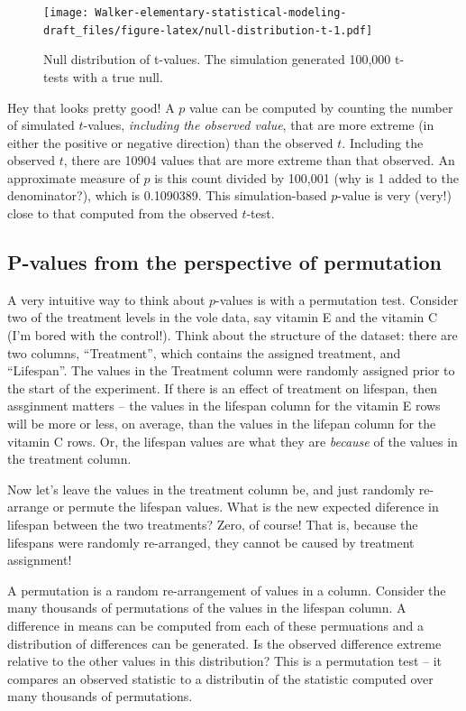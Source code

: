 \documentclass[]{book}
\theoremstyle{definition}
\theoremstyle{definition}
\theoremstyle{definition}
\theoremstyle{remark}
\begin{document}
\begin{figure}
\centering
\texttt{[image: Walker-elementary-statistical-modeling-draft\_files/figure-latex/null-distribution-t-1.pdf]}
\caption{\label{fig:null-distribution-t}Null distribution of t-values. The
simulation generated 100,000 t-tests with a true null.}
\end{figure}

Hey that looks pretty good! A \(p\) value can be computed by counting
the number of simulated \(t\)-values, \emph{including the observed
value}, that are more extreme (in either the positive or negative
direction) than the observed \(t\). Including the observed \(t\), there
are 10904 values that are more extreme than that observed. An
approximate measure of \(p\) is this count divided by 100,001 (why is 1
added to the denominator?), which is 0.1090389. This simulation-based
\(p\)-value is very (very!) close to that computed from the observed
\(t\)-test.

\subsection{P-values from the perspective of
permutation}\label{p-values-from-the-perspective-of-permutation}

A very intuitive way to think about \(p\)-values is with a permutation
test. Consider two of the treatment levels in the vole data, say vitamin
E and the vitamin C (I'm bored with the control!). Think about the
structure of the dataset: there are two columns, ``Treatment'', which
contains the assigned treatment, and ``Lifespan''. The values in the
Treatment column were randomly assigned prior to the start of the
experiment. If there is an effect of treatment on lifespan, then
assginment matters -- the values in the lifespan column for the vitamin
E rows will be more or less, on average, than the values in the lifepan
column for the vitamin C rows. Or, the lifespan values are what they are
\emph{because} of the values in the treatment column.

Now let's leave the values in the treatment column be, and just randomly
re-arrange or permute the lifespan values. What is the new expected
diference in lifespan between the two treatments? Zero, of course! That
is, because the lifespans were randomly re-arranged, they cannot be
caused by treatment assignment!

A permutation is a random re-arrangement of values in a column. Consider
the many thousands of permutations of the values in the lifespan column.
A difference in means can be computed from each of these permuations and
a distribution of differences can be generated. Is the observed
difference extreme relative to the other values in this distribution?
This is a permutation test -- it compares an observed statistic to a
distributin of the statistic computed over many thousands of
permutations.
\end{document}

